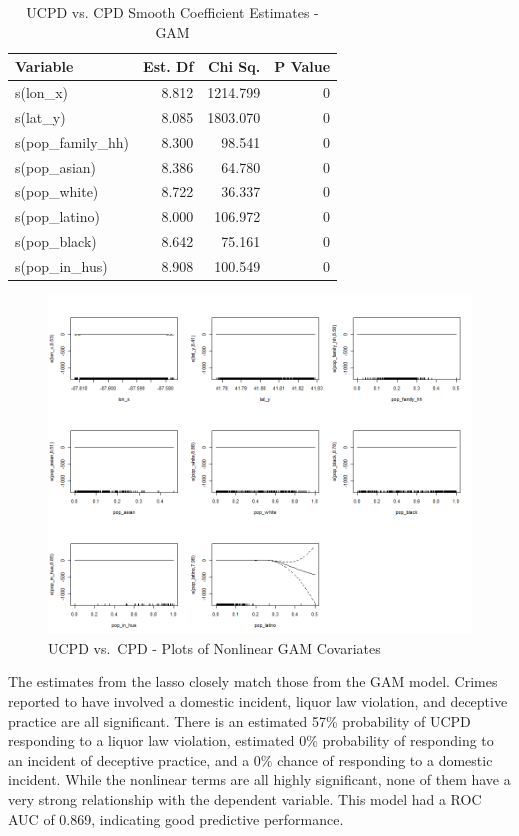 \documentclass{ucetd}
\begin{document}
\begin{table}

\caption{\label{tab:ucpd-gam}UCPD vs. CPD Smooth Coefficient Estimates - GAM}
\centering
\begin{tabular}[t]{l|r|r|r}
\hline
Variable & Est. Df & Chi Sq. & P Value\\
\hline
s(lon\_x) & 8.812 & 1214.799 & 0\\
\hline
s(lat\_y) & 8.085 & 1803.070 & 0\\
\hline
s(pop\_family\_hh) & 8.300 & 98.541 & 0\\
\hline
s(pop\_asian) & 8.386 & 64.780 & 0\\
\hline
s(pop\_white) & 8.722 & 36.337 & 0\\
\hline
s(pop\_latino) & 8.000 & 106.972 & 0\\
\hline
s(pop\_black) & 8.642 & 75.161 & 0\\
\hline
s(pop\_in\_hus) & 8.908 & 100.549 & 0\\
\hline
\end{tabular}
\end{table}

\begin{figure}
\centering
\includegraphics[width=1\textwidth,height=\textheight]{..//Modeling/modeling_files/figure-gfm/gam-ucpd-1.png}
\caption{UCPD vs.~CPD - Plots of Nonlinear GAM Covariates}
\end{figure}

The estimates from the lasso closely match those from the GAM model.
Crimes reported to have involved a domestic incident, liquor law
violation, and deceptive practice are all significant. There is an
estimated 57\% probability of UCPD responding to a liquor law violation,
estimated 0\% probability of responding to an incident of deceptive
practice, and a 0\% chance of responding to a domestic incident. While
the nonlinear terms are all highly significant, none of them have a very
strong relationship with the dependent variable. This model had a ROC
AUC of 0.869, indicating good predictive performance.
\end{document}

